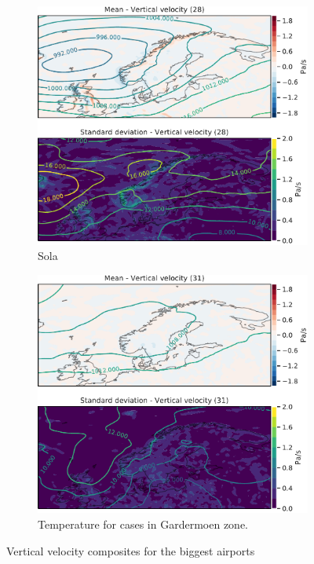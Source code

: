 \begin{figure}
\begin{subfigure}[b]{0.49\textwidth}
         \includegraphics[width=\textwidth]{Figures/WENZV.pdf}
         \caption{Sola}
         \label{fig:ENZVW}
     \end{subfigure}
    \begin{subfigure}[b]{0.5\textwidth}
    \centering
    \includegraphics[width=\textwidth]{Figures/WENGM.pdf}
    \caption{Temperature for cases in Gardermoen zone.}
    \label{fig:ENGMW}
\end{subfigure}
\caption{Vertical velocity composites for the biggest airports}
\label{fig:verticalairports}
\end{figure}

